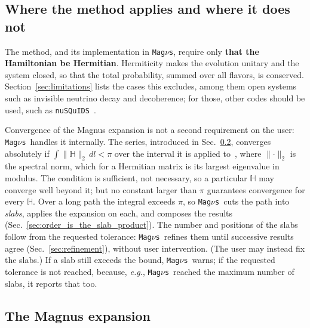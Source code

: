 \documentclass[final,5p,times,twocolumn,sort,compress]{elsarticle}
\makeatletter
\newcommand{\eg}{{\it e.g.}}
\DeclareRobustCommand{\_}{%
  \ifmmode\nfss@text{\textunderscore}\else\textunderscore\allowbreak\fi}
\newcommand{\magnus}{{\tt Mag}\ensuremath{\nu}{\tt s}}
\makeatother
\begin{document}

\subsection{Where the method applies and where it does not}
\label{sec:applicability}

The method, and its implementation in \magnus, require only \textbf{that the Hamiltonian be Hermitian}. Hermiticity makes the evolution unitary and the system closed, so that the total probability, summed over all flavors, is conserved. Section~\ref{sec:limitations} lists the cases this excludes, among them open systems such as invisible neutrino decay and decoherence; for those, other codes should be used, such as \texttt{nuSQuIDS}~\cite{Arguelles:2021twb, NuSQuIDS}.

Convergence of the Magnus expansion is not a second requirement on the user: \magnus\ handles it internally. The series, introduced in Sec.~\ref{sec:expansion}, converges absolutely if $\int \lVert \mathbb{H} \rVert_2\, dl < \pi$ over the interval it is applied to\ \cite{Moan:2008conv}, where $\lVert \cdot \rVert_2$ is the spectral norm, which for a Hermitian matrix is its largest eigenvalue in modulus. The condition is sufficient, not necessary, so a particular $\mathbb{H}$ may converge well beyond it; but no constant larger than $\pi$ guarantees convergence for every $\mathbb{H}$. Over a long path the integral exceeds $\pi$, so \magnus\ cuts the path into \emph{slabs}, applies the expansion on each, and composes the results (Sec.~\ref{sec:order_is_the_slab_product}). The number and positions of the slabs follow from the requested tolerance: \magnus\ refines them until successive results agree (Sec.~\ref{sec:refinement}), without user intervention. (The user may instead fix the slabs.) If a slab still exceeds the bound, \magnus\ warns; if the requested tolerance is not reached, because, \eg, \magnus\ reached the maximum number of slabs, it reports that too.


\subsection{The Magnus expansion}
\label{sec:expansion}
\end{document}

